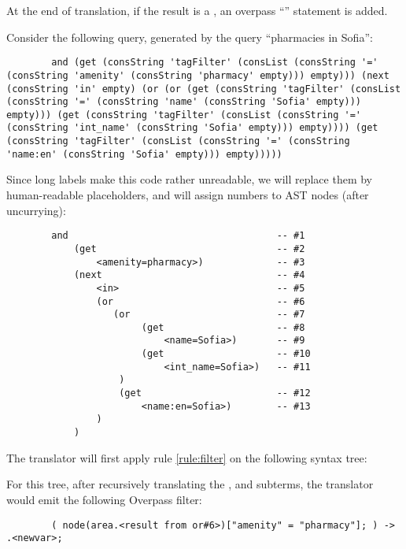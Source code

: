 \documentclass[main.tex]{subfiles}
\begin{document}
At the end of translation, if the result is a , an overpass
``'' statement is added.

\begin{example}
    Consider the following query, generated by the query ``pharmacies in Sofia'':
    \begin{lstwrap}\begin{lstlisting}
        and (get (consString 'tagFilter' (consList (consString '=' (consString 'amenity' (consString 'pharmacy' empty))) empty))) (next (consString 'in' empty) (or (or (get (consString 'tagFilter' (consList (consString '=' (consString 'name' (consString 'Sofia' empty))) empty))) (get (consString 'tagFilter' (consList (consString '=' (consString 'int_name' (consString 'Sofia' empty))) empty)))) (get (consString 'tagFilter' (consList (consString '=' (consString 'name:en' (consString 'Sofia' empty))) empty)))))
    \end{lstlisting}\end{lstwrap}
    Since long labels make this code rather unreadable, we will replace them
    by human-readable placeholders, and will assign numbers to AST nodes
    (after uncurrying):
    \begin{lstwrap}\begin{lstlisting}
        and                                     -- #1
            (get                                -- #2
                <amenity=pharmacy>)             -- #3
            (next                               -- #4
                <in>                            -- #5
                (or                             -- #6
                   (or                          -- #7
                        (get                    -- #8
                            <name=Sofia>)       -- #9
                        (get                    -- #10
                            <int_name=Sofia>)   -- #11
                    )
                    (get                        -- #12
                        <name:en=Sofia>)        -- #13
                )
            )
    \end{lstlisting}\end{lstwrap}

    The translator will first apply rule \ref{rule:filter} on the following
    syntax tree:

    For this tree, after recursively translating the ,
     and  subterms, the translator
    would emit the following Overpass filter:
    \begin{lstwrap}\begin{lstlisting}
        ( node(area.<result from or#6>)["amenity" = "pharmacy"]; ) -> .<newvar>;
    \end{lstlisting}\end{lstwrap}


\end{example}
\end{document}
